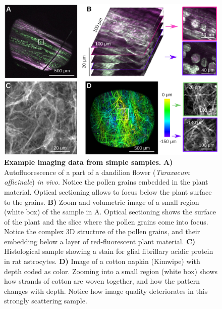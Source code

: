 \documentclass[10pt,letterpaper]{article}
\begin{document}
\begin{figure}[!t]
    \includegraphics[width=\textwidth]{fig6.jpg}
    \caption{{\bf Example imaging data from simple samples.} \textbf{A)} Autofluorescence of a part of a dandilion flower (\textit{Taraxacum officinale}) \textit{in vivo}. Notice the pollen grains embedded in the plant material. Optical sectioning allows to focus below the plant surface to the grains. \textbf{B)} Zoom and volumetric image of  a small region (white box) of the sample in A. Optical sectioning shows the surface of the plant and the slice where the pollen grains come into focus. Notice the complex 3D structure of the pollen grains, and their embedding below a layer of red-fluorescent plant material. \textbf{C)} Histological sample showing a stain for glial fibrillary acidic protein in rat astrocytes. \textbf{D)} Image of a cotton napkin (Kimwipe) with depth coded as color. Zooming into a small region (white box) shows how strands of cotton are woven together, and how the pattern changes with depth. Notice how image quality deteriorates in this strongly scattering sample.}
    \label{fig6}
\end{figure}
\end{document}
